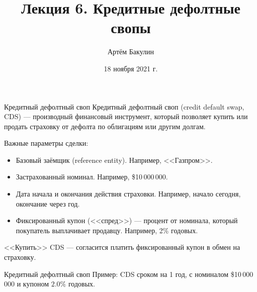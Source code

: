 \documentclass{beamer}
\title{Лекция 6. Кредитные дефолтные свопы}
\author{Артём Бакулин}
\date{18 ноября 2021 г.}
\begin{document}
\begin{frame}
\titlepage
\end{frame}

\begin{frame}{Кредитный дефолтный своп}
\justify
\alert{Кредитный дефолтный своп} (credit default swap, CDS) --- производный финансовый инструмент, который позволяет купить или продать страховку от дефолта по облигациям или другим долгам.

\justify
Важные параметры сделки:
\begin{itemize}
\justifying
\item Базовый заёмщик (reference entity). Например, <<Газпром>>.
\item Застрахованный номинал. Например, \$10\,000\,000.
\item Дата начала и окончания действия страховки. Например, начало сегодня, окончание через год.
\item Фиксированный купон (<<спред>>) --- процент от номинала, который покупатель выплачивает продавцу. Например, 2\% годовых.
\end{itemize}

\justify
<<Купить>> CDS --- согласится платить фиксированный купон в обмен на страховку.
\end{frame}



\newcommand{\swapPartyNode}[5]{

	\draw (#1, #2)
		node[
			rectangle,
			draw,
			rounded corners,
			anchor = south,
			minimum height = 0.8cm,
			minimum width = 2.5cm
		]
		{#5}
	--
	(#3, #4);
}

\newcommand{\swapBuyerPaymentEx}[7]{

	\draw [
		->,
		>=triangle 90
	] 
	(#1, #2)
	node[
		label = left:{#7}
	]{}
	-- (#3, #4)
	node[
		pos=0.5,
		anchor=south
	]
	{#5}
	node[
		pos=0.5,
		anchor=north
	]
	{#6};
}

\newcommand{\swapBuyerPayment}[6]{

	\swapBuyerPaymentEx{#1}{#2}{#3}{#4}{#5}{}{#6}
}

\begin{frame}{Кредитный дефолтный своп}
\justify
Пример: CDS сроком на 1 год, с номиналом \$10\,000\,000 и купоном $2.0\%$ годовых.

\justify
\centering
{}
\end{frame}
\end{document}
